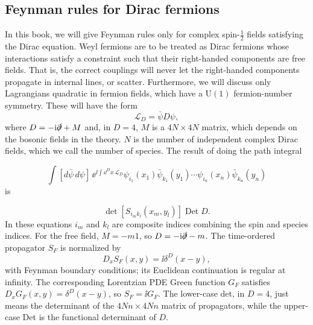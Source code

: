 \subsection{Feynman rules for Dirac fermions}

In this book, we will give Feynman rules only for complex spin-$\frac12$ fields satisfying the
Dirac equation. Weyl fermions are to be treated as Dirac fermions whose interactions
satisfy a constraint such that their right-handed components are free fields. That is,
the correct couplings will never let the right-handed components propagate in internal
lines, or scatter. Furthermore, we will discuss only Lagrangians quadratic in fermion
fields, which have a $\mathrm{U}(1)$ fermion-number symmetry. These will have the form
\begin{equation*}
  \mathcal{L}_D=\bar\psi D\psi,
\end{equation*}
where $D=-\mathrm{i}\slashed\partial+M$ and, in $D=4$, $M$ is a $4N\times4N$ matrix, which depends on the bosonic fields
in the theory. $N$ is the number of independent complex Dirac fields, which we call the
number of species. The result of doing the path integral

\begin{equation}
  \int[d\bar\psi\,d\psi]\,\ee^{\ii\int\dd^D x\,\mathcal{L}_D}
  \psi_{i_1}(x_1)\bar\psi_{k_1}(y_1)\cdots
  \psi_{i_n}(x_n)\bar\psi_{k_n}(y_n)
  \label{eq:5.7}
\end{equation}
is

\begin{equation}
  \det\!\left[S_{i_mk_l}(x_m,y_l)\right]\operatorname{Det}D.
  \label{eq:5.8}
\end{equation}
In these equations $i_m$ and $k_l$ are composite indices combining the spin and species
indices. For the free field, $M=-m1$, so $D=-\mathrm{i}\slashed\partial-m$. The time-ordered
propagator $S_F$ is normalized by
\begin{equation*}
  D_xS_F(x,y)=\ii\delta^D(x-y),
\end{equation*}
with Feynman boundary conditions; its Euclidean continuation is regular at infinity.
The corresponding Lorentzian PDE Green function $G_F$ satisfies
$D_xG_F(x,y)=\delta^D(x-y)$,
so $S_F=\ii G_F$. The lower-case det, in $D=4$, just means the determinant of the
$4Nn\times4Nn$ matrix of propagators, while the upper-case Det is the functional
determinant of $D$.

